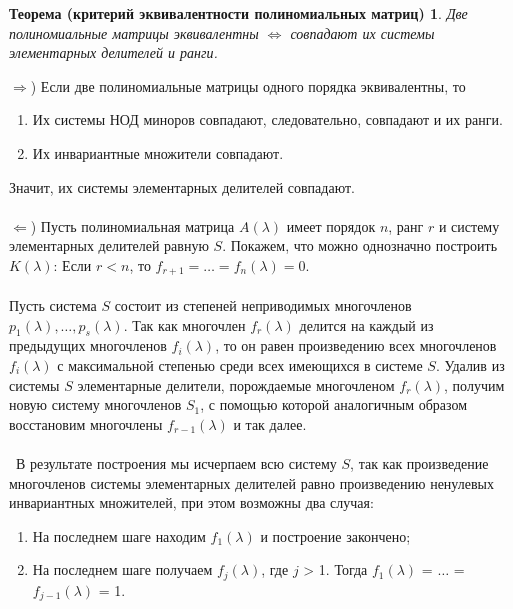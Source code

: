 \newtheorem*{th12_3_1}{Теорема (критерий эквивалентности полиномиальных матриц)}\begin{th12_3_1}Две полиномиальные матрицы эквивалентны $\Longleftrightarrow$ совпадают их системы элементарных делителей и ранги.
\end{th12_3_1}\begin{Proof}
	$\Rightarrow$) Если две полиномиальные матрицы одного порядка эквивалентны, то\begin{enumerate}
		\item Их системы НОД миноров совпадают, следовательно, совпадают и их ранги.
		\item Их инвариантные множители совпадают.
	\end{enumerate}
	Значит, их системы элементарных делителей совпадают.\\\\
	$\Leftarrow$) Пусть полиномиальная матрица $A(\lambda)$ имеет порядок $n$, ранг $r$ и систему элементарных делителей равную $S$. Покажем, что можно однозначно построить $K(\lambda)$: Если $r < n$, то $f_{r+1} = \ldots = f_n(\lambda) = 0$.\\\\
	Пусть система $S$ состоит из степеней неприводимых многочленов $p_1(\lambda), \dots, p_s(\lambda)$. Так как многочлен $f_r(\lambda)$ делится на каждый из предыдущих многочленов $f_i(\lambda)$, то он равен произведению всех многочленов $f_i(\lambda)$ с максимальной степенью среди всех имеющихся в системе $S$. Удалив из системы $S$ элементарные делители, порождаемые многочленом $f_r(\lambda)$, получим новую систему многочленов $S_1$, с помощью которой аналогичным образом восстановим многочлены $f_{r-1}(\lambda)$ и так далее.\\\\\
	В результате построения мы исчерпаем всю систему $S$, так как  произведение многочленов системы элементарных делителей равно произведению ненулевых инвариантных множителей, при этом возможны два случая:
	\begin{enumerate}
		\item На последнем шаге находим $f_1(\lambda)$ и построение закончено;
		\item На последнем шаге получаем $f_j(\lambda)$, где $j$ > 1. Тогда $f_1(\lambda)$ = $\dots$ = $f_{j-1}(\lambda)$ = 1.
	\end{enumerate}
\end{Proof}
